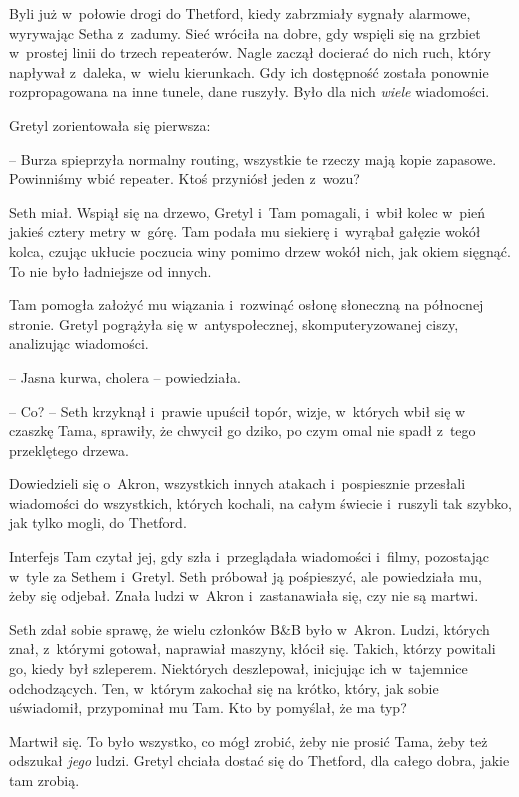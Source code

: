 \documentclass[oneside,polish,11pt,sfheadings]{mwbk}
\begin{document}
Byli już w~połowie drogi do Thetford, kiedy zabrzmiały sygnały alarmowe,
wyrywając Setha z~zadumy. Sieć wróciła na dobre, gdy wspięli się na
grzbiet w~prostej linii do trzech repeaterów. Nagle zaczął docierać do
nich ruch, który napływał z~daleka, w~wielu kierunkach. Gdy ich
dostępność została ponownie rozpropagowana na inne tunele, dane ruszyły.
Było dla nich \textit{wiele }wiadomości.

Gretyl zorientowała się pierwsza: 

-- Burza spieprzyła normalny routing,
wszystkie te rzeczy mają kopie zapasowe. Powinniśmy wbić repeater. Ktoś
przyniósł jeden z~wozu?

Seth miał. Wspiął się na drzewo, Gretyl i~Tam pomagali, i~wbił kolec w~pień jakieś cztery metry w~górę. Tam podała mu siekierę i~wyrąbał
gałęzie wokół kolca, czując ukłucie poczucia winy pomimo drzew wokół
nich, jak okiem sięgnąć. To nie było ładniejsze od innych.

Tam pomogła założyć mu wiązania i~rozwinąć osłonę słoneczną na północnej
stronie. Gretyl pogrążyła się w~antyspołecznej, skomputeryzowanej ciszy,
analizując wiadomości.

-- Jasna kurwa, cholera -- powiedziała.

-- Co? -- Seth krzyknął i~prawie upuścił topór, wizje, w~których wbił się
w czaszkę Tama, sprawiły, że chwycił go dziko, po czym omal nie spadł z~tego przeklętego drzewa.

Dowiedzieli się o~Akron, wszystkich innych atakach i~pospiesznie
przesłali wiadomości do wszystkich, których kochali, na całym świecie i~ruszyli tak szybko, jak tylko mogli, do Thetford.

Interfejs Tam czytał jej, gdy szła i~przeglądała wiadomości i~filmy,
pozostając w~tyle za Sethem i~Gretyl. Seth próbował ją pośpieszyć, ale
powiedziała mu, żeby się odjebał. Znała ludzi w~Akron i~zastanawiała
się, czy nie są martwi.

Seth zdał sobie sprawę, że wielu członków B\&B było w~Akron. Ludzi,
których znał, z~którymi gotował, naprawiał maszyny, kłócił się. Takich,
którzy powitali go, kiedy był szleperem. Niektórych deszlepował,
inicjując ich w~tajemnice odchodzących. Ten, w~którym zakochał się na
krótko, który, jak sobie uświadomił, przypominał mu Tam. Kto by
pomyślał, że ma typ?

Martwił się. To było wszystko, co mógł zrobić, żeby nie prosić Tama,
żeby też odszukał \textit{jego }ludzi. Gretyl chciała dostać się do
Thetford, dla całego dobra, jakie tam zrobią.
\end{document}
